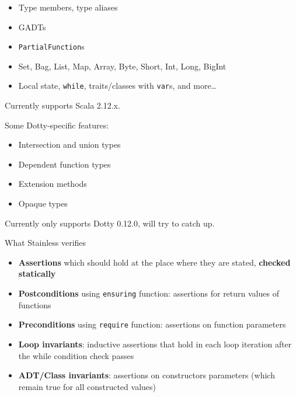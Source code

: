 \documentclass[
  ignorenonframetext,
]{beamer}
\providecommand{\tightlist}{%
  \setlength{\itemsep}{0pt}\setlength{\parskip}{0pt}}
\begin{document}
\begin{frame}[fragile]

\begin{itemize}
\tightlist
\item
  Type members, type aliases
\item
  GADTs
\item
  \texttt{PartialFunction}s
\item
  Set, Bag, List, Map, Array, Byte, Short, Int, Long, BigInt
\item
  Local state, \texttt{while}, traits/classes with \texttt{var}s, and
  more\ldots{}
\end{itemize}

Currently supports Scala 2.12.x.

\end{frame}

\begin{frame}

Some Dotty-specific features:

\begin{itemize}
\tightlist
\item
  Intersection and union types
\item
  Dependent function types
\item
  Extension methods
\item
  Opaque types
\end{itemize}

Currently only supports Dotty 0.12.0, will try to catch up.

\end{frame}

\begin{frame}[fragile]{What Stainless verifies}
\protect\hypertarget{what-stainless-verifies}{}

\begin{itemize}
\tightlist
\item
  \textbf{Assertions} which should hold at the place where they are
  stated, \textbf{checked statically}
\item
  \textbf{Postconditions} using \texttt{ensuring} function: assertions
  for return values of functions
\item
  \textbf{Preconditions} using \texttt{require} function: assertions on
  function parameters
\item
  \textbf{Loop invariants}: inductive assertions that hold in each loop
  iteration after the while condition check passes
\item
  \textbf{ADT/Class invariants}: assertions on constructors parameters
  (which remain true for all constructed values)
\end{itemize}

\end{frame}
\end{document}
